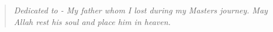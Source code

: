 %



\dedication
\vspace*{\fill}
\begin{center}
\begin{quote}
\hfil \hsp \Large \em Dedicated to - My father whom I lost during my Masters journey. May Allah rest his soul and place him in heaven.\hfil
\end{quote}
\vspace*{\fill}
\end{center}
\newpage
\cleardoublepage
\thispagestyle{empty}
\startarabicpagination
